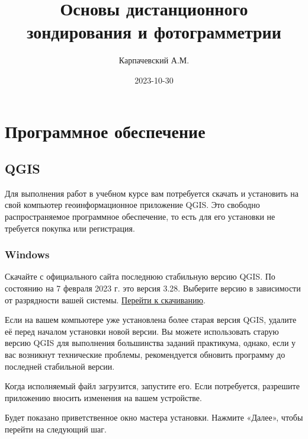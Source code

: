 \documentclass[
  12pt,
]{book}
\title{Основы дистанционного зондирования и фотограмметрии}
\author{Карпачевский А.М.}
\date{2023-10-30}
\begin{document}
\maketitle

{
\hypersetup{linkcolor=}
\setcounter{tocdepth}{1}
\tableofcontents
}
\hypertarget{ux43fux440ux43eux433ux440ux430ux43cux43cux43dux43eux435-ux43eux431ux435ux441ux43fux435ux447ux435ux43dux438ux435}{%
\chapter*{Программное обеспечение}\label{ux43fux440ux43eux433ux440ux430ux43cux43cux43dux43eux435-ux43eux431ux435ux441ux43fux435ux447ux435ux43dux438ux435}}

\hypertarget{qgis}{%
\section*{QGIS}\label{qgis}}

Для выполнения работ в учебном курсе вам потребуется скачать и установить на свой компьютер геоинформационное приложение QGIS. Это свободно распространяемое программное обеспечение, то есть для его установки не требуется покупка или регистрация.

\hypertarget{windows}{%
\subsection*{Windows}\label{windows}}

Скачайте с официального сайта последнюю стабильную версию QGIS. По состоянию на 7 февраля 2023 г. это версия 3.28. Выберите версию в зависимости от разрядности вашей системы. \href{https://qgis.org/downloads/QGIS-OSGeo4W-3.16.16-1.msi}{Перейти к скачиванию}.

Если на вашем компьютере уже установлена более старая версия QGIS, удалите её перед началом установки новой версии. Вы можете использовать старую версию QGIS для выполнения большинства заданий практикума, однако, если у вас возникнут технические проблемы, рекомендуется обновить программу до последней стабильной версии.

Когда исполняемый файл загрузится, запустите его. Если потребуется, разрешите приложению вносить изменения на вашем устройстве.

Будет показано приветственное окно мастера установки. Нажмите «Далее», чтобы перейти на следующий шаг.
\end{document}
